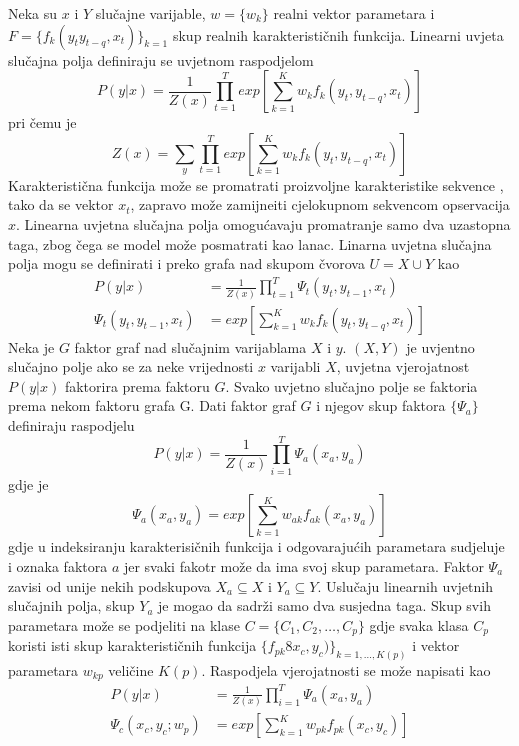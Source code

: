 \documentclass[conference]{IEEEtran}
\begin{document}
Neka su $x$ i $Y$ slu\v{c}ajne varijable, $ w = \{w_k\} $ realni vektor parametara i $F = \{ f_k(y_t y_{t-q},x_t)\}_{k=1}$ skup realnih karakteristi\v{c}nih funkcija. 
Linearni uvjeta slu\v{c}ajna polja definiraju se uvjetnom raspodjelom 
\[
P(y|x) = \frac{1}{Z(x)} \prod_{t=1}^T exp \left[ \sum_{k=1}^K w_k f_k(y_t,y_{t-q},x_t)\right] 
\]
pri \v{c}emu je \[ Z(x) = \sum_y \prod_{t=1}^T exp \left[ \sum_{k=1}^K w_k f_k(y_t,y_{t-q},x_t)\right]  \]
Karakteristi\v{c}na funkcija mo\v{z}e se promatrati proizvoljne karakteristike 
sekvence , tako da se vektor $x_t$, zapravo mo\v{z}e zamijneiti cjelokupnom sekvencom opservacija $x$.
Linearna uvjetna slu\v{c}ajna polja omogu\'cavaju promatranje samo dva uzastopna taga, zbog \v{c}ega se model mo\v{z}e posmatrati kao lanac. Linarna uvjetna slu\v{c}ajna polja mogu se definirati i preko grafa nad skupom \v{c}vorova $U=X \cup Y$ kao  
\begin{align*}
P(y|x) &= \frac{1}{Z(x)} \prod _{t=1}^T \Psi_t (y_t, y_{t-1},x_t)  \\
\Psi_t(y_t,y_{t-1},x_t) &= exp \left[ \sum_{k=1}^K w_k f_k(y_t,y_{t-q},x_t)\right]
\end{align*}
Neka je $G$ faktor graf nad slu\v{c}ajnim varijablama $X$ i $y$. $(X,Y)$ je uvjentno slu\v{c}ajno polje ako se za neke vrijednosti $x$ varijabli $X$, uvjetna vjerojatnost $P(y|x)$ 
faktorira prema faktoru $G$.  
Svako uvjetno slu\v{c}ajno polje se faktoria prema nekom faktoru grafa G.  Dati faktor graf $G$ i njegov skup faktora $\{\Psi_a \}$ definiraju raspodjelu \[ P(y|x) = \frac{1}{Z(x)} \prod_{i=1}^T \Psi_a(x_a,y_a) \]
gdje je \[ \Psi_a(x_a,y_a) = exp \left[ \sum_{k=1}^K w_{ak} f_{ak}(x_a,y_a)\right] \]
gdje u indeksiranju karakterisičnih funkcija i odgovaraju\'cih parametara sudjeluje i oznaka faktora $a$ jer svaki fakotr mo\v{z}e da ima svoj skup parametara. Faktor $\Psi_a$ zavisi od unije nekih podskupova $X_a \subseteq X$ i $Y_a \subseteq Y$. Uslu\v{c}aju linearnih uvjetnih slu\v{c}ajnih polja, skup $Y_a$ je mogao da sadr\v{z}i samo dva susjedna taga. Skup svih parametara mo\v{z}e se podjeliti na klase $C=\{C_1, C_2, \ldots , C_p\}$ gdje svaka klasa $C_p$ koristi isti skup karakteristi\v{c}nih funkcija $\{ f_{pk} 8 x_c,y_c)\}_{k= 1,\ldots,K(p)}$ i vektor parametara $w_{kp}$ veli\v{c}ine $K(p)$. Raspodjela vjerojatnosti se mo\v{z}e napisati kao 
\begin{align*}
P(y|x) &= \frac{1}{Z(x)} \prod_{i=1}^T \Psi_a(x_a,y_a) \\
\Psi_c(x_c,y_c;w_p) &= exp \left[ \sum_{k=1}^K w_{pk} f_{pk}(x_c,y_c)\right]
\end{align*}
 
\end{document}
